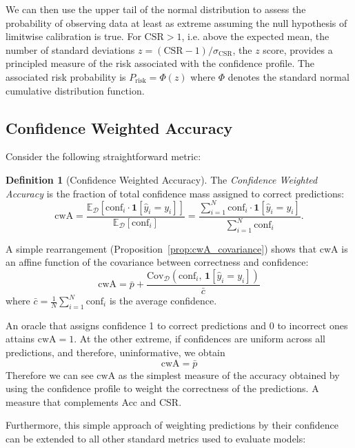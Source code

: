 \documentclass{article}
\theoremstyle{plain}
\theoremstyle{definition}
\newtheorem{definition}{Definition}
\theoremstyle{remark}
\begin{document}
We can then use the upper tail of the normal distribution to assess the probability of observing data at least as extreme assuming the null hypothesis of limitwise calibration is true. For $\mathrm{CSR} > 1$, i.e. above the expected mean, the number of standard deviations  $z = (\text{CSR} - 1)/\sigma_{\text{CSR}}$, the $z$ score, provides a principled measure of the risk associated with the confidence profile. The associated risk probability is $P_{\mathrm{risk}} = \Phi(z)$ where $\Phi$ denotes the standard normal cumulative distribution function.

\subsection{Confidence Weighted Accuracy}

Consider the following straightforward metric:
\smallskip

\begin{definition}[Confidence Weighted Accuracy]\label{def:cwA}
The \emph{Confidence Weighted Accuracy} is the fraction of total confidence 
mass assigned to correct predictions:
\[
    \mathrm{cwA} = \frac{\mathbb{E}_{\mathcal{D}}[\mathrm{conf}_i \cdot \mathbf{1}[\hat{y}_i = y_i]]}{\mathbb{E}_{\mathcal{D}}[\mathrm{conf}_i]}= \frac{\sum_{i=1}^N \mathrm{conf}_i \cdot \mathbf{1}[\hat{y}_i = y_i]}{\sum_{i=1}^N \mathrm{conf}_i}.
\]
\end{definition}
\smallskip

A simple rearrangement (Proposition~\ref{prop:cwA_covariance}) shows that cwA is an affine function of the covariance between correctness and confidence: \[
    \mathrm{cwA} = \bar{p} + \frac{\mathrm{Cov}_{\mathcal{D}}(\mathrm{conf}_i,\, \mathbf{1}[\hat{y}_i = y_i])}{\bar{c}}
\]
where $\bar{c} = \frac{1}{N} \sum_{i=1}^N \text{conf}_i$ is the average confidence.

An oracle that assigns confidence 1 to correct predictions and 0 to incorrect ones attains $\mathrm{cwA} = 1$. At the other extreme, if confidences are uniform across all predictions, and therefore, uninformative, we obtain \[
\mathrm{cwA} = \bar{p} 
\]
Therefore we can see $\mathrm{cwA}$ as the simplest measure of the accuracy obtained by using the confidence profile to weight the correctness of the predictions. A measure that complements Acc and CSR.
\smallskip

Furthermore, this simple approach of weighting predictions by their confidence can be extended to all other standard metrics used to evaluate models:
\smallskip
\end{document}
